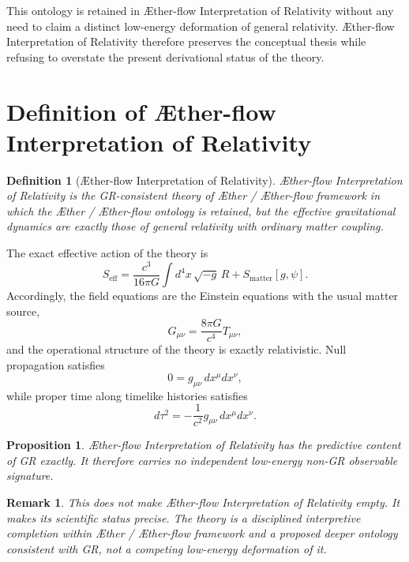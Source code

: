 \documentclass[11pt]{article}
\newcommand{\Aether}{\AE{}ther}
\newcommand{\Aflow}{\AE{}ther-flow}
\newcommand{\TheoryName}{\Aflow{} Interpretation of Relativity}
\newcommand{\TheoryProgram}{\Aether{} / \Aflow{} framework}
\newtheorem{proposition}{Proposition}
\newtheorem{remark}{Remark}
\newtheorem{definition}{Definition}
\begin{document}
This ontology is retained in \TheoryName{} without any need to claim a distinct low-energy deformation of general relativity. \TheoryName{} therefore preserves the conceptual thesis while refusing to overstate the present derivational status of the theory.

\section{Definition of \TheoryName{}}

\begin{definition}[\TheoryName{}]
\TheoryName{} is the GR-consistent theory of \TheoryProgram{} in which the \Aether{} / \Aflow{} ontology is retained, but the effective gravitational dynamics are exactly those of general relativity with ordinary matter coupling.
\end{definition}

The exact effective action of the theory is
\begin{equation}
S_{\mathrm{eff}}
=
\frac{c^3}{16\pi G}\int d^4x\,\sqrt{-g}\,R
+
S_{\mathrm{matter}}[g,\psi].
\label{eq:SA}
\end{equation}
Accordingly, the field equations are the Einstein equations with the usual matter source,
\begin{equation}
G_{\mu\nu} = \frac{8\pi G}{c^4} T_{\mu\nu},
\label{eq:einstein}
\end{equation}
and the operational structure of the theory is exactly relativistic. Null propagation satisfies
\begin{equation}
0 = g_{\mu\nu}\,dx^{\mu}dx^{\nu},
\label{eq:null}
\end{equation}
while proper time along timelike histories satisfies
\begin{equation}
d\tau^2 = -\frac{1}{c^2} g_{\mu\nu}\,dx^{\mu}dx^{\nu}.
\label{eq:propertime}
\end{equation}

\begin{proposition}
\TheoryName{} has the predictive content of GR exactly. It therefore carries no independent low-energy non-GR observable signature.
\end{proposition}

\begin{remark}
This does not make \TheoryName{} empty. It makes its scientific status precise. The theory is a disciplined interpretive completion within \TheoryProgram{} and a proposed deeper ontology consistent with GR, not a competing low-energy deformation of it.
\end{remark}
\end{document}
